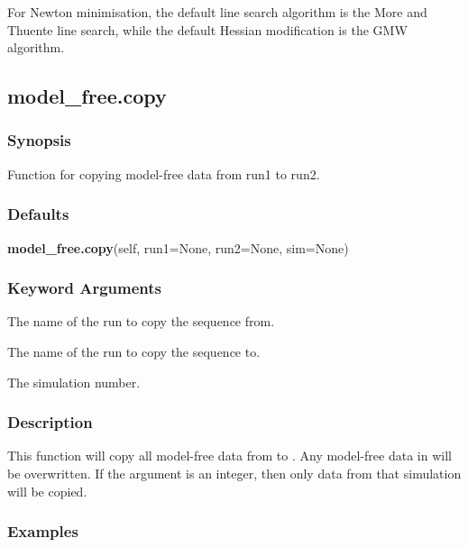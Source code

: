 For Newton minimisation, the default line search algorithm is the More and Thuente line search, while the default Hessian modification is the GMW algorithm.




\newpage

\subsection{model\_free.copy}


\subsubsection{Synopsis}

Function for copying model-free data from run1 to run2.



\subsubsection{Defaults}

\textsf{\textbf{model\_free.copy}(self, run1=None, run2=None, sim=None)}


\subsubsection{Keyword Arguments}

  The name of the run to copy the sequence from. 

  The name of the run to copy the sequence to. 

  The simulation number. 




\subsubsection{Description}

This function will copy all model-free data from  to .  Any model-free data in  will be overwritten.  If the argument  is an integer, then only data from that simulation will be copied.



\subsubsection{Examples}

